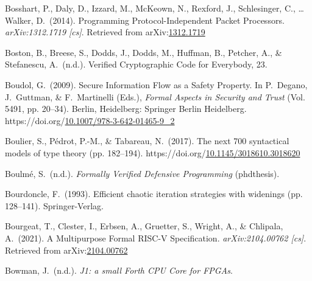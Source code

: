 \documentclass[12pt,twoside]{article}
\begin{document}
{\begin{thebibliography}{1079}
\mdbibitemlabel{}Bosshart, P., Daly, D., Izzard, M., McKeown, N., Rexford, J., Schlesinger, C., … Walker, D.~(2014). Programming Protocol-Independent Packet Processors. \emph{arXiv:1312.1719 {}[cs]}. Retrieved from arXiv:\href{http://arxiv.org/abs/1312.1719}{1312.1719}%

\mdbibitemlabel{}Boston, B., Breese, S., Dodds, J., Dodds, M., Huﬀman, B., Petcher, A., \& Stefanescu, A.~(n.d.). Veriﬁed Cryptographic Code for Everybody, 23.%

\mdbibitemlabel{}Boudol, G.~(2009). Secure Information Flow as a Safety Property. In P.~Degano, J.~Guttman, \& F.~Martinelli (Eds.), \emph{Formal Aspects in Security and Trust} (Vol. 5491, pp. 20–34). Berlin, Heidelberg: Springer Berlin Heidelberg. https://doi.org/\href{https://dx.doi.org/10.1007/978-3-642-01465-9_2}{10.1007/978-3-642-01465-9\_2}%

\mdbibitemlabel{}Boulier, S., Pédrot, P.-M., \& Tabareau, N.~(2017). The next 700 syntactical models of type theory (pp. 182–194). https://doi.org/\href{https://dx.doi.org/10.1145/3018610.3018620}{10.1145/3018610.3018620}%

\mdbibitemlabel{}Boulmé, S.~(n.d.). \emph{Formally Veriﬁed Defensive Programming} (phdthesis).%

\mdbibitemlabel{}Bourdoncle, F.~(1993). Efficient chaotic iteration strategies with widenings (pp. 128–141). Springer-Verlag.%

\mdbibitemlabel{}Bourgeat, T., Clester, I., Erbsen, A., Gruetter, S., Wright, A., \& Chlipala, A.~(2021). A Multipurpose Formal RISC-V Specification. \emph{arXiv:2104.00762 {}[cs]}. Retrieved from arXiv:\href{http://arxiv.org/abs/2104.00762}{2104.00762}%

\mdbibitemlabel{}Bowman, J.~(n.d.). \emph{J1: a small Forth CPU Core for FPGAs}.%


\end{thebibliography}}
\end{document}
